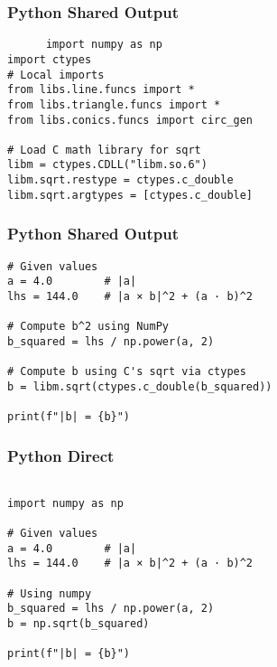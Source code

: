 \documentclass{beamer}
\begin{document}
\begin{frame}[fragile]
     \frametitle{Python Shared Output}
      \begin{lstlisting}
      import numpy as np
import ctypes
# Local imports
from libs.line.funcs import *
from libs.triangle.funcs import *
from libs.conics.funcs import circ_gen

# Load C math library for sqrt
libm = ctypes.CDLL("libm.so.6")
libm.sqrt.restype = ctypes.c_double
libm.sqrt.argtypes = [ctypes.c_double]
  \end{lstlisting}
\end{frame}

\begin{frame}[fragile]
     \frametitle{Python Shared Output}
      \begin{lstlisting}
# Given values
a = 4.0        # |a|
lhs = 144.0    # |a × b|^2 + (a · b)^2

# Compute b^2 using NumPy
b_squared = lhs / np.power(a, 2)

# Compute b using C's sqrt via ctypes
b = libm.sqrt(ctypes.c_double(b_squared))

print(f"|b| = {b}")
\end{lstlisting}
\end{frame}

\begin{frame}[fragile]
     \frametitle{Python Direct}
      \begin{lstlisting}

import numpy as np

# Given values
a = 4.0        # |a|
lhs = 144.0    # |a × b|^2 + (a · b)^2

# Using numpy
b_squared = lhs / np.power(a, 2)
b = np.sqrt(b_squared)

print(f"|b| = {b}")
\end{lstlisting}
\end{frame}
\end{document}
